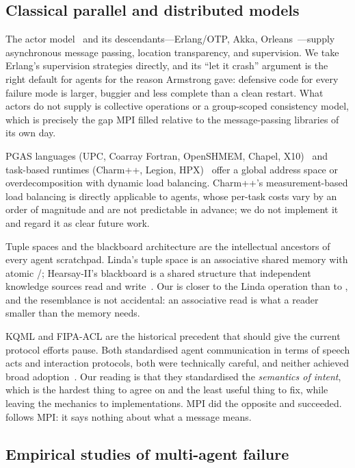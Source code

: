 \subsection{Classical parallel and distributed models}

The actor model~\cite{agha1986actors} and its descendants---Erlang/OTP,
Akka, Orleans~\cite{Armstrong2003,Akka2025,bernstein2014orleans}---supply
asynchronous message passing, location transparency, and supervision. We
take Erlang's supervision strategies directly, and its ``let it crash''
argument is the right default for agents for the reason Armstrong gave:
defensive code for every failure mode is larger, buggier and less complete
than a clean restart. What actors do not supply is collective operations or
a group-scoped consistency model, which is precisely the gap MPI filled
relative to the message-passing libraries of its own day.

PGAS languages (UPC, Coarray Fortran, OpenSHMEM, Chapel,
X10)~\cite{alvanos2013pgas} and task-based runtimes (Charm++, Legion,
HPX)~\cite{Charm2025} offer a global address space or overdecomposition with
dynamic load balancing. Charm++'s measurement-based load balancing is
directly applicable to agents, whose per-task costs vary by an order of
magnitude and are not predictable in advance; we do not implement it and
regard it as clear future work.

Tuple spaces and the blackboard architecture are the intellectual ancestors
of every agent scratchpad. Linda's tuple space is an associative shared
memory with atomic /; Hearsay-II's blackboard is a shared
structure that independent knowledge sources
read and write~\cite{erman1980hearsay}. Our  is closer to the
Linda  operation than to , and the resemblance is not
accidental: an associative read is what a reader smaller than the memory
needs.

KQML and FIPA-ACL are the historical precedent that should give the current
protocol efforts pause. Both standardised agent communication in terms of
speech acts and interaction protocols, both were technically careful, and
neither achieved broad adoption~\cite{ehtesham2025survey}. Our reading is
that they standardised the \emph{semantics of intent}, which is the hardest
thing to agree on and the least useful thing to fix, while leaving the
mechanics to implementations. MPI did the opposite and succeeded. \ampi{}
follows MPI: it says nothing about what a message means.

\subsection{Empirical studies of multi-agent failure}

